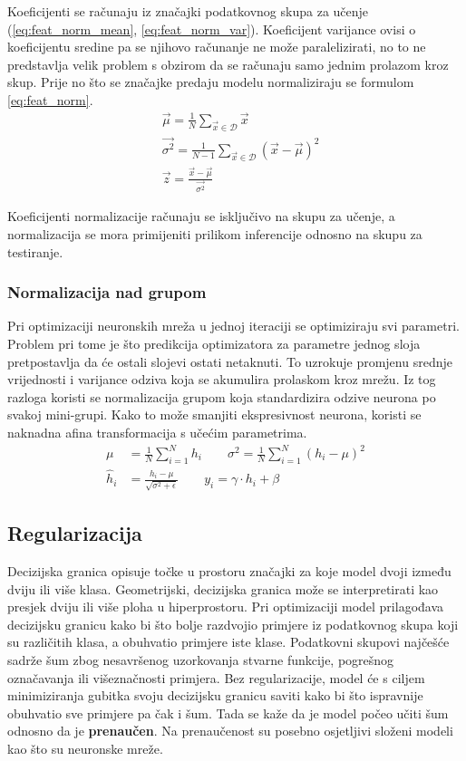 \documentclass[times, utf8, numeric, diplomski]{fer}
\def\dataset{\mathcal{D}}
\begin{document}
Koeficijenti se računaju iz značajki podatkovnog skupa za učenje (\ref{eq:feat_norm_mean}, \ref{eq:feat_norm_var}). Koeficijent varijance ovisi o koeficijentu sredine pa se njihovo računanje ne može paralelizirati, no to ne predstavlja velik problem s obzirom da se računaju samo jednim prolazom kroz skup. Prije no što se značajke predaju modelu normaliziraju se formulom \eqref{eq:feat_norm}.
\begin{align}
\label{eq:feat_norm_mean}
&\vec{\mu} = \frac{1}{N} \sum_{\vec{x}\in \dataset} \vec{x} \\
\label{eq:feat_norm_var}
&\vec{\sigma^2} = \frac{1}{N-1} \sum_{\vec{x}\in \dataset} (\vec{x}-\vec{\mu})^2 \\
\label{eq:feat_norm}
&\vec{z} = \frac{\vec{x} - \vec{\mu}}{\vec{\sigma^2}}
\end{align}

Koeficijenti normalizacije računaju se isključivo na skupu za učenje, a normalizacija se mora primijeniti prilikom inferencije odnosno na skupu za testiranje.

\subsubsection{Normalizacija nad grupom}

Pri optimizaciji neuronskih mreža u jednoj iteraciji se optimiziraju svi parametri. Problem pri tome je što predikcija optimizatora za parametre jednog sloja pretpostavlja da će ostali slojevi ostati netaknuti. To uzrokuje promjenu srednje vrijednosti i varijance odziva koja se akumulira prolaskom kroz mrežu. Iz tog razloga koristi se normalizacija grupom koja standardizira odzive neurona po svakoj mini-grupi. Kako to može smanjiti ekspresivnost neurona, koristi se naknadna afina transformacija s učećim parametrima.
\begin{align}
\mu &= \frac{1}{N} \sum_{i=1}^N h_i \qquad
\sigma^2 = \frac{1}{N} \sum_{i=1}^N (h_i-\mu)^2 \\
\hat{h}_i &= \frac{h_i - \mu}{\sqrt{\sigma^2 + \epsilon}} \qquad
y_i = \gamma \cdot h_i + \beta
\end{align}

\subsection{Regularizacija}
\label{sec:regularizacija}
Decizijska granica opisuje točke u prostoru značajki za koje model dvoji između dviju ili više klasa. Geometrijski, decizijska granica može se interpretirati kao presjek dviju ili više ploha u hiperprostoru. Pri optimizaciji model prilagođava decizijsku granicu kako bi što bolje razdvojio primjere iz podatkovnog skupa koji su različitih klasa, a obuhvatio primjere iste klase. Podatkovni skupovi najčešće sadrže šum zbog nesavršenog uzorkovanja stvarne funkcije, pogrešnog označavanja ili višeznačnosti primjera. Bez regularizacije, model će s ciljem minimiziranja gubitka svoju decizijsku granicu saviti kako bi što ispravnije obuhvatio sve primjere pa čak i šum. Tada se kaže da je model počeo učiti šum odnosno da je \textbf{prenaučen}. Na prenaučenost su posebno osjetljivi složeni modeli kao što su neuronske mreže.
\end{document}
